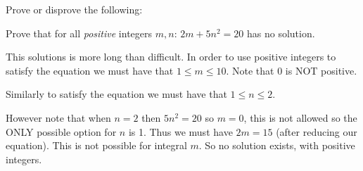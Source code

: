 \documentclass[addpoints,answers]{exam}
\begin{document}
\begin{questions}


  \question[6] Prove or disprove the following:

  \question[7] Prove that for all \emph{positive} integers $m,n$: $2m + 5n^2 = 20$ has no solution.
  \vspace*{\fill}
  \begin{solution}
    This solutions is more long than difficult. In order to use positive integers to satisfy the equation we must have that $1\leq m \leq 10$. Note that 0 is NOT positive.

    Similarly to satisfy the equation we must have that $1 \leq n \leq 2$. 

    However note that when $n=2$ then $5n^2 = 20$ so $m =0$, this is not allowed so the ONLY possible option for $n$ is 1. Thus we must have $2m = 15$ (after reducing our equation). This is not possible for integral $m$. So no solution exists, with positive integers.


\end{solution}
\end{questions}
\end{document}
